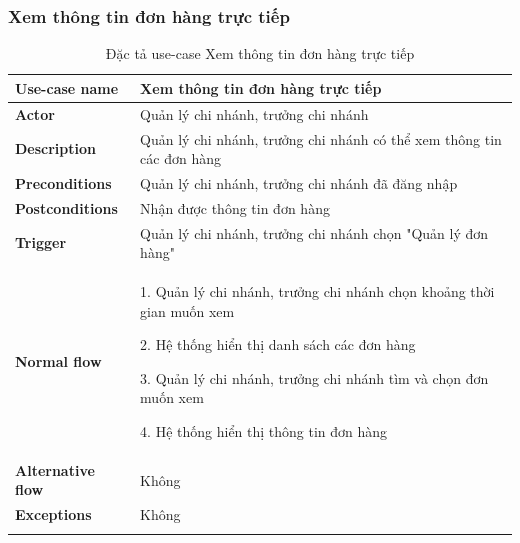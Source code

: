 \subsubsection{Xem thông tin đơn hàng trực tiếp}
{
    \setlength\extrarowheight{6pt}
    \begin{longtable}{| p{} | p{} |}
        \hline
        \textbf{Use-case name}
         &
        Xem thông tin đơn hàng trực tiếp
        \\
        \hline
        \textbf{Actor}
         &
        Quản lý chi nhánh, trưởng chi nhánh
        \\
        \hline
        \textbf{Description}
         &
        Quản lý chi nhánh, trưởng chi nhánh có thể xem thông tin các đơn hàng
        \\
        \hline
        \textbf{Preconditions}
         &
        Quản lý chi nhánh, trưởng chi nhánh đã đăng nhập
        \\
        \hline
        \textbf{Postconditions}
         &
        Nhận được thông tin đơn hàng
        \\
        \hline
        \textbf{Trigger}
         &
        Quản lý chi nhánh, trưởng chi nhánh chọn "Quản lý đơn hàng"
        \\
        \hline
        \begin{flushleft}
            \textbf{Normal flow}
        \end{flushleft}
         &
        1. Quản lý chi nhánh, trưởng chi nhánh chọn khoảng thời gian muốn xem

        2. Hệ thống hiển thị danh sách các đơn hàng

        3. Quản lý chi nhánh, trưởng chi nhánh tìm và chọn đơn muốn xem

        4. Hệ thống hiển thị thông tin đơn hàng
        \\
        \hline
        \textbf{Alternative flow}
         &
        Không
        \\
        \hline
        \textbf{Exceptions}
         &
        Không
        \\
        \hline
        \caption{Đặc tả use-case Xem thông tin đơn hàng trực tiếp}
    \end{longtable}
}

